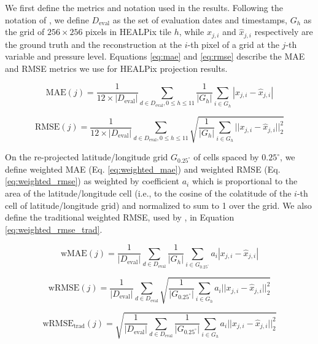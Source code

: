 \documentclass[11pt, a4paper, logo, copyright, numbering]{googledeepmind}
\begin{document}
We first define the metrics and notation used in the results. Following the notation of \cite{lam2023graphcast}, we define $D_{\text{eval}}$ as the set of evaluation dates and timestamps, $G_h$ as the grid of $256 \times 256$ pixels in HEALPix tile $h$, while $x_{j,i}$ and $\hat x_{j,i}$ respectively are the ground truth and the reconstruction at the $i$-th pixel of a grid at the $j$-th variable and pressure level. Equations \ref{eq:mae} and \ref{eq:rmse} describe the MAE and RMSE metrics we use for HEALPix projection results.

\begin{equation}
    \text{MAE} (j) = \frac{1}{12 \times | D_{\text{eval}} |} \sum _{d \in D_{\text{eval}}, 0 \leq h \leq 11} \frac{1}{| G_h |} \sum _{i \in G_h} | x_{j,i} - \hat x_{j,i} |
    \label{eq:mae}
\end{equation}

\begin{equation}
    \text{RMSE} (j) = \frac{1}{12 \times | D_{\text{eval}} |} \sum _{d \in D_{\text{eval}}, 0 \leq h \leq 11} \sqrt{\frac{1}{| G_h |} \sum _{i \in G_h} || x_{j,i} - \hat x_{j,i} ||_2^2}
    \label{eq:rmse}
\end{equation}

On the re-projected latitude/longitude grid $G_{0.25^\circ}$ of cells spaced by $0.25^\circ$, we define weighted MAE (Eq. \ref{eq:weighted_mae}) and weighted RMSE (Eq. \ref{eq:weighted_rmse}) as weighted by coefficient $a_i$ which is proportional to the area of the latitude/longitude cell (i.e., to the cosine of the colatitude of the $i$-th cell of latitude/longitude grid) and normalized to sum to 1 over the grid. We also define the traditional weighted RMSE, used by \citet{huang2022compressing}, in Equation \ref{eq:weighted_rmse_trad}.

\begin{equation}
    \text{wMAE} (j) = \frac{1}{| D_{\text{eval}} |} \sum _{d \in D_{\text{eval}}} \frac{1}{| G_h |} \sum _{i \in G_{0.25^\circ}} a_i | x_{j,i} - \hat x_{j,i} |
    \label{eq:weighted_mae}
\end{equation}

\begin{equation}
    \text{wRMSE} (j) = \frac{1}{| D_{\text{eval}} |} \sum _{d \in D_{\text{eval}}} \sqrt{\frac{1}{| G_{0.25^\circ} |} \sum _{i \in G_h} a_i || x_{j,i} - \hat x_{j,i} ||_2^2}
    \label{eq:weighted_rmse}
\end{equation}

\begin{equation}
    \text{wRMSE}_{\text{trad}} (j) = \sqrt{\frac{1}{| D_{\text{eval}} |} \sum _{d \in D_{\text{eval}}} \frac{1}{| G_{0.25^\circ} |} \sum _{i \in G_h} a_i || x_{j,i} - \hat x_{j,i} ||_2^2}
    \label{eq:weighted_rmse_trad}
\end{equation}
\end{document}
